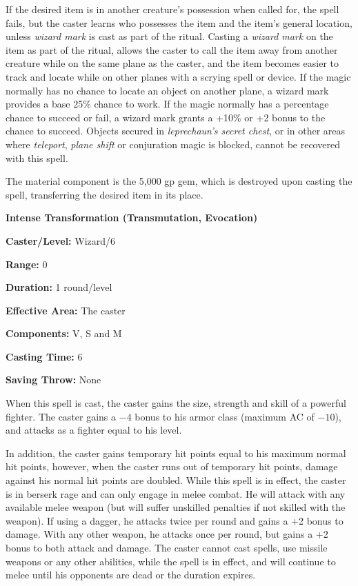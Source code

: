 \begin{multicols}{2}
If the desired item is in another creature's possession when called for, the spell fails, but the caster learns who possesses the item and the item's general location, unless \textit{wizard mark} is cast as part of the ritual.  Casting a \textit{wizard mark} on the item as part of the ritual, allows the caster to call the item away from another creature while on the same plane as the caster, and the item becomes easier to track and locate while on other planes with a scrying spell or device.  If the magic normally has no chance to locate an object on another plane, a wizard mark provides a base 25\% chance to work.  If the magic normally has a percentage chance to succeed or fail, a wizard mark grants a +10\% or +2 bonus to the chance to succeed.  Objects secured in \textit{leprechaun's secret chest}, or in other areas where \textit{teleport}, \textit{plane shift} or conjuration magic is blocked, cannot be recovered with this spell.  

The material component is the 5,000 gp gem, which is destroyed upon casting the spell, transferring the desired item in its place.

\vspace{1em}

\noindent
\begin{minipage}{\columnwidth}

\noindent \textbf{Intense Transformation (Transmutation, Evocation)}

\noindent \textbf{Caster/Level:} Wizard/6

\noindent \textbf{Range:} 0

\noindent \textbf{Duration:} 1 round/level

\noindent \textbf{Effective Area:} The caster

\noindent \textbf{Components:} V, S and M

\noindent \textbf{Casting Time:} 6

\noindent \textbf{Saving Throw:} None

\end{minipage}

When this spell is cast, the caster gains the size, strength and skill of a powerful fighter.  The caster gains a $-4$ bonus to his armor class (maximum AC of $-10$), and attacks as a fighter equal to his level.  

In addition, the caster gains temporary hit points equal to his maximum normal hit points, however, when the caster runs out of temporary hit points, damage against his normal hit points are doubled.  While this spell is in effect, the caster is in berserk rage and can only engage in melee combat.  He will attack with any available melee weapon (but will suffer unskilled penalties if not skilled with the weapon).  If using a dagger, he attacks twice per round and gains a +2 bonus to damage.  With any other weapon, he attacks once per round, but gains a +2 bonus to both attack and damage.  The caster cannot cast spells, use missile weapons or any other abilities, while the spell is in effect, and will continue to melee until his opponents are dead or the duration expires.
 

\end{multicols}
